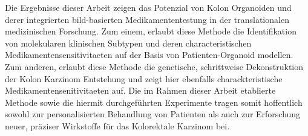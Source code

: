 Die Ergebnisse dieser Arbeit zeigen das Potenzial von Kolon Organoiden und derer integrierten bild-basierten Medikamententestung in der translationalen medizinischen Forschung. Zum einem, erlaubt diese Methode die Identifikation von molekularen klinischen Subtypen und deren characteristischen Medikamentensensitivitaeten auf der Basis von Patienten-Organoid modellen. Zum anderen, erlaubt diese Methode die genetische, schrittweise Dekonstruktion der Kolon Karzinom Entstehung und zeigt hier ebenfalls charackteristische Medikamentensenitivitaeten auf. Die im Rahmen dieser Arbeit etablierte Methode sowie die hiermit durchgeführten Experimente tragen somit hoffentlich sowohl zur personalisierten Behandlung von Patienten als auch zur Erforschung neuer, präziser Wirkstoffe für das Kolorektale Karzinom bei.